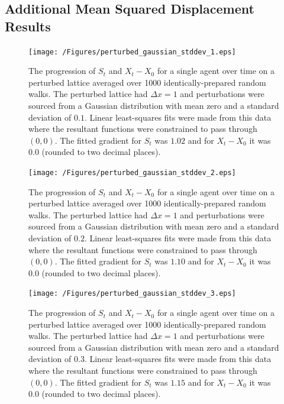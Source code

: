 \documentclass[11pt,titlepage,a4paper]{article}
\begin{document}
\pagebreak
\begin{appendix}
	
	\renewcommand\thefigure{\thesection.\arabic{figure}}

	\section{Additional Mean Squared Displacement Results}
	\label{appendix:MSD}
	\setcounter{figure}{0}

		\begin{figure}[tbh]
			\centering
				\texttt{[image: /Figures/perturbed\_gaussian\_stddev\_1.eps]}
			\caption{The progression of $S_t$ and $X_t - X_0$ for a single agent over time on a perturbed lattice averaged over 1000 identically-prepared random walks. The perturbed lattice had $\Delta x = 1$ and perturbations were sourced from a Gaussian distribution with mean zero and a standard deviation of $0.1$. Linear least-squares fits were made from this data where the resultant functions were constrained to pass through $(0,0)$. The fitted gradient for $S_t$ was $1.02$ and for $X_t - X_0$ it was $0.0$ (rounded to two decimal places).}
			\label{fig:perturbed_gaussian_stddev_1}
		\end{figure}

		\begin{figure}[tbh]
			\centering
				\texttt{[image: /Figures/perturbed\_gaussian\_stddev\_2.eps]}
			\caption{The progression of $S_t$ and $X_t - X_0$ for a single agent over time on a perturbed lattice averaged over 1000 identically-prepared random walks. The perturbed lattice had $\Delta x = 1$ and perturbations were sourced from a Gaussian distribution with mean zero and a standard deviation of $0.2$. Linear least-squares fits were made from this data where the resultant functions were constrained to pass through $(0,0)$. The fitted gradient for $S_t$ was $1.10$ and for $X_t - X_0$ it was $0.0$ (rounded to two decimal places).}
			\label{fig:perturbed_gaussian_stddev_2}
		\end{figure}

		\begin{figure}[tbh]
			\centering
				\texttt{[image: /Figures/perturbed\_gaussian\_stddev\_3.eps]}
			\caption{The progression of $S_t$ and $X_t - X_0$ for a single agent over time on a perturbed lattice averaged over 1000 identically-prepared random walks. The perturbed lattice had $\Delta x = 1$ and perturbations were sourced from a Gaussian distribution with mean zero and a standard deviation of $0.3$. Linear least-squares fits were made from this data where the resultant functions were constrained to pass through $(0,0)$. The fitted gradient for $S_t$ was $1.15$ and for $X_t - X_0$ it was $0.0$ (rounded to two decimal places).}
			\label{fig:perturbed_gaussian_stddev_3}
		\end{figure}


\end{appendix}
\end{document}
